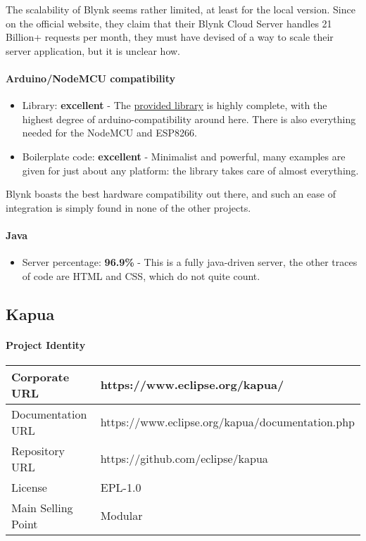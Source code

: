 \documentclass{article}
\begin{document}
The scalability of Blynk seems rather limited, at least for the local version. Since on the official website, they claim that their Blynk Cloud Server handles 21 Billion+ requests per month, they must have devised of a way to scale their server application, but it is unclear how.

\paragraph{Arduino/NodeMCU compatibility}

\begin{itemize}
\item Library: \textbf{excellent} - The \href{https://github.com/blynkkk/blynk-library}{provided library} is highly complete, with the highest degree of arduino-compatibility around here. There is also everything needed for the NodeMCU and ESP8266.
\item Boilerplate code: \textbf{excellent} - Minimalist and powerful, many examples are given for just about any platform: the library takes care of almost everything.
\end{itemize}

Blynk boasts the best hardware compatibility out there, and such an ease of integration is simply found in none of the other projects.

\paragraph{Java}

\begin{itemize}
\item Server percentage: \textbf{96.9\%} - This is a fully java-driven server, the other traces of code are HTML and CSS, which do not quite count.
\end{itemize}

\subsection{Kapua}

\paragraph{Project Identity}

\begin{center}
\begin{tabular}{|l|l|}
\hline
Corporate URL & https://www.eclipse.org/kapua/ \\ \hline
Documentation URL & https://www.eclipse.org/kapua/documentation.php \\ \hline
Repository URL & https://github.com/eclipse/kapua \\ \hline
License & EPL-1.0 \\ \hline
Main Selling Point & Modular \\ \hline
\end{tabular}
\end{center}
\end{document}
